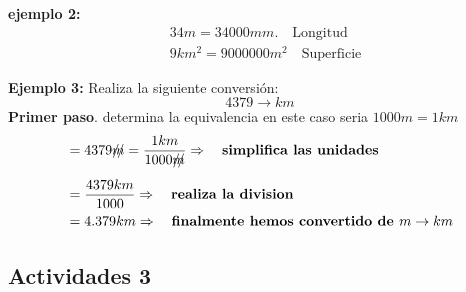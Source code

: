 \documentclass[12pt]{article}
\begin{document}
  
  
\begin{tcolorbox}[colback=red!15!]
\textbf{ejemplo 2:}
     \begin{equation*}
         \begin{split}
                  &34 m= 34000 mm. \quad\text{Longitud} \\
&9km^2=9000000 m^2 \quad\text{Superficie}   
         \end{split}
     \end{equation*}
     
\textbf{Ejemplo 3:} Realiza la siguiente conversión:$$ 4379  \rightarrow km$$
 \textbf{Primer paso}. determina la equivalencia en este caso seria $1000 m= 1 km$ \\
 \begin{equation*}
  \begin{split}
            &=4379\xout{m}=\dfrac{1km}{1000\xout{m}}\Rightarrow\quad\textbf{simplifica las unidades}\\
        &= \dfrac{4379km}{1000}\Rightarrow\quad\textbf{realiza la division}\\
                &=4.379km \Rightarrow\quad\textbf{finalmente hemos convertido de $m \rightarrow km$}
 \end{split}  
 \end{equation*}
 
 
  \end{tcolorbox}
\begin{tcolorbox}[colback=red!5!white]%
\centering
\section*{Actividades 3}
\end{tcolorbox}
\end{document}
